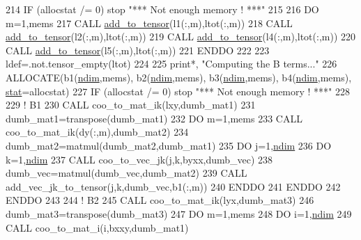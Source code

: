 \begin{DoxyCode}
214     \textcolor{keywordflow}{IF} (allocstat /= 0) stop \textcolor{stringliteral}{"*** Not enough memory ! ***"}
215     
216     \textcolor{keywordflow}{DO} m=1,mems
217        \textcolor{keyword}{CALL }\hyperlink{namespacetensor_aad7cd55f3a4cec4676cc7ca34b05f1a8}{add\_to\_tensor}(l1(:,m),ltot(:,m))
218        \textcolor{keyword}{CALL }\hyperlink{namespacetensor_aad7cd55f3a4cec4676cc7ca34b05f1a8}{add\_to\_tensor}(l2(:,m),ltot(:,m))
219        \textcolor{keyword}{CALL }\hyperlink{namespacetensor_aad7cd55f3a4cec4676cc7ca34b05f1a8}{add\_to\_tensor}(l4(:,m),ltot(:,m))
220        \textcolor{keyword}{CALL }\hyperlink{namespacetensor_aad7cd55f3a4cec4676cc7ca34b05f1a8}{add\_to\_tensor}(l5(:,m),ltot(:,m))
221 \textcolor{keywordflow}{    ENDDO}
222 
223     ldef=.not.tensor\_empty(ltot)
224        
225     print*, \textcolor{stringliteral}{"Computing the B terms..."}
226     \textcolor{keyword}{ALLOCATE}(b1(\hyperlink{namespaceparams_a2323fe1773f086e20c14f266351c482b}{ndim},mems), b2(\hyperlink{namespaceparams_a2323fe1773f086e20c14f266351c482b}{ndim},mems), b3(\hyperlink{namespaceparams_a2323fe1773f086e20c14f266351c482b}{ndim},mems), b4(\hyperlink{namespaceparams_a2323fe1773f086e20c14f266351c482b}{ndim},mems), 
      \hyperlink{namespacestat}{stat}=allocstat)
227     \textcolor{keywordflow}{IF} (allocstat /= 0) stop \textcolor{stringliteral}{"*** Not enough memory ! ***"}
228     
229     \textcolor{comment}{! B1}
230     \textcolor{keyword}{CALL }coo\_to\_mat\_ik(lxy,dumb\_mat1)
231     dumb\_mat1=transpose(dumb\_mat1)
232     \textcolor{keywordflow}{DO} m=1,mems
233        \textcolor{keyword}{CALL }coo\_to\_mat\_ik(dy(:,m),dumb\_mat2)
234        dumb\_mat2=matmul(dumb\_mat2,dumb\_mat1)
235        \textcolor{keywordflow}{DO} j=1,\hyperlink{namespaceparams_a2323fe1773f086e20c14f266351c482b}{ndim}
236           \textcolor{keywordflow}{DO} k=1,\hyperlink{namespaceparams_a2323fe1773f086e20c14f266351c482b}{ndim}
237              \textcolor{keyword}{CALL }coo\_to\_vec\_jk(j,k,byxx,dumb\_vec)
238              dumb\_vec=matmul(dumb\_vec,dumb\_mat2)
239              \textcolor{keyword}{CALL }add\_vec\_jk\_to\_tensor(j,k,dumb\_vec,b1(:,m))
240 \textcolor{keywordflow}{          ENDDO}
241 \textcolor{keywordflow}{       ENDDO}
242 \textcolor{keywordflow}{    ENDDO}
243     
244     \textcolor{comment}{! B2}
245     \textcolor{keyword}{CALL }coo\_to\_mat\_ik(lyx,dumb\_mat3)
246     dumb\_mat3=transpose(dumb\_mat3)
247     \textcolor{keywordflow}{DO} m=1,mems
248        \textcolor{keywordflow}{DO} i=1,\hyperlink{namespaceparams_a2323fe1773f086e20c14f266351c482b}{ndim}
249           \textcolor{keyword}{CALL }coo\_to\_mat\_i(i,bxxy,dumb\_mat1)

\end{DoxyCode}
